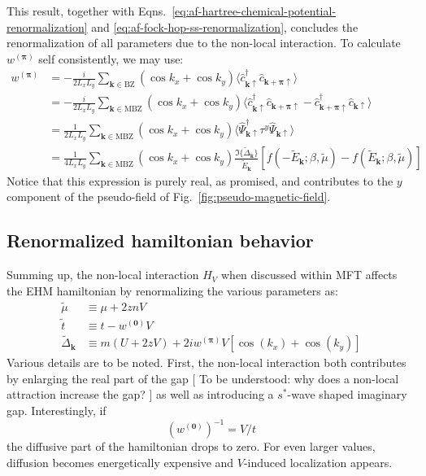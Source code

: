 This result, together with Eqns.~\eqref{eq:af-hartree-chemical-potential-renormalization} and \eqref{eq:af-fock-hop-ss-renormalization}, concludes the renormalization of all parameters due to the non-local interaction. To calculate $w^{(\bm{\pi})}$ self consistently, we may use:
\begin{align}
	w^{(\bm{\pi})} &= -\frac{i}{2L_xL_y} \sum_{\mathbf{k}\in\mathrm{BZ}}
	\left(
		\cos k_x + \cos k_y
	\right) \langle
		\hat c_{\mathbf{k}\uparrow}^\dagger  \hat c_{\mathbf{k}+\bm{\pi}\uparrow}
	\rangle \nonumber \\
	&= -\frac{i}{2L_xL_y} \sum_{\mathbf{k}\in\mathrm{MBZ}}
	\left(
		\cos k_x + \cos k_y
	\right) \langle
		\hat c_{\mathbf{k}\uparrow}^\dagger  \hat c_{\mathbf{k}+\bm{\pi}\uparrow} - \hat c_{\mathbf{k}+\bm{\pi}\uparrow}^\dagger  \hat c_{\mathbf{k}\uparrow}
	\rangle \nonumber  \\
	&= \frac{1}{2L_xL_y} \sum_{\mathbf{k}\in\mathrm{MBZ}}
	\left(
	\cos k_x + \cos k_y
	\right) \langle
		\hat \Psi_{\mathbf{k}\uparrow}^\dagger \tau^y \hat \Psi_{\mathbf{k}\uparrow}
	\rangle \nonumber \\
	&= \frac{1}{4L_xL_y} \sum_{\mathbf{k}\in\mathrm{MBZ}}
	\left(
		\cos k_x + \cos k_y
	\right) \frac{\Im\{\tilde{\Delta}_\mathbf{k}\}}{\tilde{E}_\mathbf{k}} \left[
		f\left(
			-\tilde{E}_\mathbf{k};\beta,\tilde{\mu}
		\right) - f\left(
			\tilde{E}_\mathbf{k};\beta,\tilde{\mu}
		\right)
	\right] \label{eq:af-renormalized-self-consistent-equation-wpi}
 	\end{align}
Notice that this expression is purely real, as promised, and contributes to the $y$ component of the pseudo-field of Fig.~\ref{fig:pseudo-magnetic-field}.

\subsection{Renormalized hamiltonian behavior}

Summing up, the non-local interaction $\hat H_V$ when discussed within MFT affects the EHM hamiltonian by renormalizing the various parameters as:
\[
\begin{aligned}
	\tilde{\mu} &\equiv \mu + 2znV \\
	\tilde{t} &\equiv t - w^{(\mathbf{0})} V \\
	\tilde{\Delta}_\mathbf{k} &\equiv
	m(U + 2zV) + 2iw^{(\bm{\pi})}V
	\left[
		\cos \left(
			k_x
		\right)	+ \cos \left(
			k_y
		\right)	
	\right]
\end{aligned}
\]
Various details are to be noted. First, the non-local interaction both contributes by enlarging the real part of the gap {\color{tabred}[
	To be understood: why does a non-local attraction increase the gap?
]} as well as introducing a $s^*$-wave shaped imaginary gap. Interestingly, if
\[
	\left(w^{(\mathbf{0})}\right)^{-1} = V/t
\]
the diffusive part of the hamiltonian drops to zero. For even larger values, diffusion becomes energetically expensive and $V$-induced localization appears.

